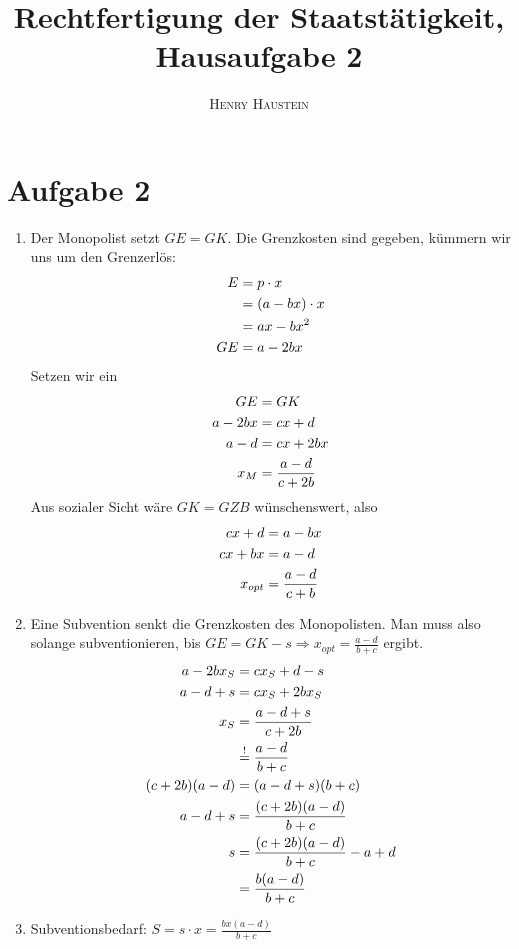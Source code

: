 \documentclass{article}
\title{\textbf{Rechtfertigung der Staatstätigkeit, Hausaufgabe 2}}
\author{\textsc{Henry Haustein}}
\date{}
\begin{document}
	\maketitle
	
	\section*{Aufgabe 2}
	\begin{enumerate}[label=(\alph*)]
		\item Der Monopolist setzt $GE=GK$. Die Grenzkosten sind gegeben, kümmern wir uns um den Grenzerlös:
		\begin{align}
			E &= p\cdot x \notag \\
			&= (a-bx)\cdot x \notag \\
			&= ax - bx^2 \notag \\
			GE &= a - 2bx \notag
		\end{align}
		Setzen wir ein
		\begin{align}
			GE &= GK \notag \\
			a-2bx &= cx+d \notag \\
			a-d &= cx+2bx \notag \\
			x_M &= \frac{a-d}{c+2b} \notag
		\end{align}
		Aus sozialer Sicht wäre $GK=GZB$ wünschenswert, also
		\begin{align}
			cx+d &= a-bx \notag \\
			cx+bx &= a-d \notag \\
			x_{opt} &= \frac{a-d}{c+b} \notag
		\end{align}
		\item Eine Subvention senkt die Grenzkosten des Monopolisten. Man muss also solange subventionieren, bis $GE=GK-s \Rightarrow x_{opt}=\frac{a-d}{b+c}$ ergibt.
		\begin{align}
			a-2bx_S &= cx_S+d-s \notag \\
			a-d+s &= cx_S + 2bx_S \notag \\
			x_S &= \frac{a-d+s}{c+2b} \notag \\
			&\overset{!}{=} \frac{a-d}{b+c} \notag \\
			(c+2b)(a-d) &= (a-d+s)(b+c) \notag \\
			a-d+s &= \frac{(c+2b)(a-d)}{b+c} \notag \\
			s &= \frac{(c+2b)(a-d)}{b+c}-a+d \notag \\
			&= \frac{b(a-d)}{b+c} \notag
		\end{align}
		\item Subventionsbedarf: $S = s\cdot x = \frac{bx(a-d)}{b+c}$
		\begin{center}
\end{center}
\end{enumerate}
\end{document}
